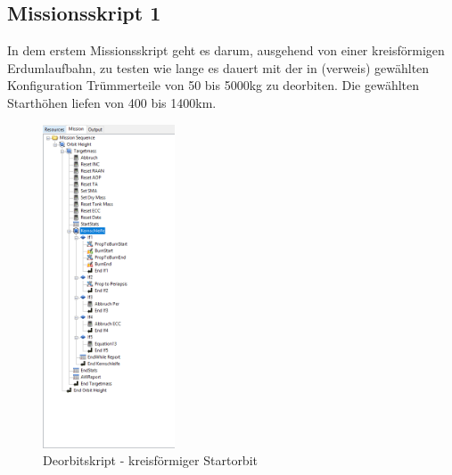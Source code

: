 
\subsection{Missionsskript 1}

In dem erstem Missionsskript geht es darum, ausgehend von einer kreisförmigen Erdumlaufbahn, zu testen wie lange es dauert mit der in (verweis) gewählten Konfiguration Trümmerteile von 50 bis 5000kg zu deorbiten. Die gewählten Starthöhen liefen von 400 bis 1400km.\\

\begin{figure}[!h]
	\centering
		\includegraphics[width=0.35\textwidth]{graphics/GMAT/GMAT_Skript_Kreis.PNG}
	\caption{Deorbitskript - kreisförmiger Startorbit}
	\label{fig:GMAT_Skript_Kreis}
\end{figure}


